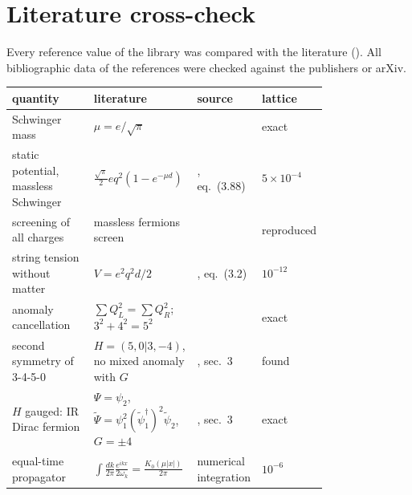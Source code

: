 \section{Literature cross-check}\label{sec:literature}
Every reference value of the library was compared with the literature (). All
bibliographic data of the references were checked against the publishers or arXiv.
\begin{center}
\small
\begin{tabular}{@{}p{0.27\linewidth}p{0.33\linewidth}p{0.18\linewidth}l@{}}
\toprule
quantity & literature & source & lattice \\
\midrule
Schwinger mass & $\mu = e/\sqrt\pi$ & \cite{Schwinger1962} & exact \\
static potential, massless Schwinger & $\frac{\sqrt\pi}{2}eq^2(1 - e^{-\mu d})$ & \cite{BharadwajIsenKang2026}, eq.~(3.88) & $5\times10^{-4}$ \\
screening of all charges & massless fermions screen & \cite{CJS1975} & reproduced \\
string tension without matter & $V = e^2q^2d/2$ & \cite{BharadwajIsenKang2026}, eq.~(3.2) & $10^{-12}$ \\
anomaly cancellation & $\sum Q_L^2 = \sum Q_R^2$; $3^2+4^2 = 5^2$ & \cite{Tong2022,WangWen2019} & exact \\
second symmetry of 3-4-5-0 & $H = (5,0|3,-4)$, no mixed anomaly with $G$ & \cite{Tong2022}, sec.~3 & found \\
$H$ gauged: IR Dirac fermion & $\Psi = \psi_2$, $\tilde\Psi = \psi_1^2(\tilde\psi_1^\dagger)^2\tilde\psi_2$, $G = \pm4$ & \cite{Tong2022}, sec.~3 & exact \\
equal-time propagator & $\int\frac{dk}{2\pi}\frac{e^{ikx}}{2\omega_k} = \frac{K_0(\mu|x|)}{2\pi}$ & numerical integration & $10^{-6}$ \\
\bottomrule
\end{tabular}
\end{center}
